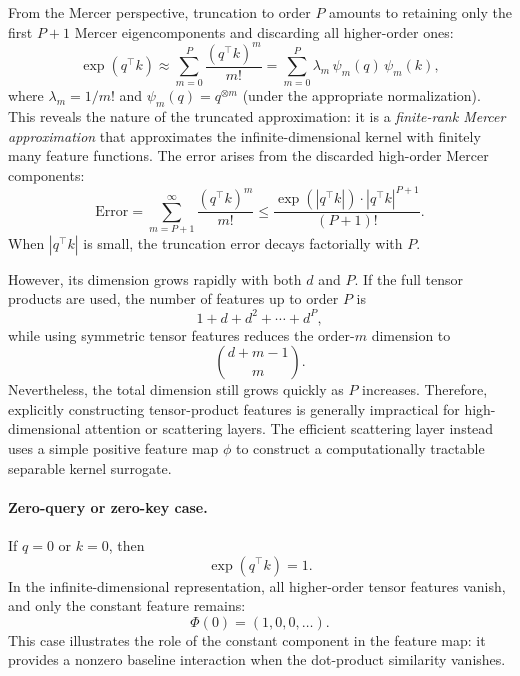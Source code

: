 \documentclass{article}
\begin{document}
From the Mercer perspective, truncation to order $P$ amounts to retaining only the first $P+1$ Mercer eigencomponents and discarding all higher-order ones:
\begin{equation}
    \exp(q^\top k)\approx\sum_{m=0}^{P}\frac{(q^\top k)^m}{m!}
    =
    \sum_{m=0}^{P}\lambda_m\,\psi_m(q)\,\psi_m(k),
\end{equation}
where $\lambda_m=1/m!$ and $\psi_m(q)=q^{\otimes m}$ (under the appropriate normalization). This reveals the nature of the truncated approximation: it is a \emph{finite-rank Mercer approximation} that approximates the infinite-dimensional kernel with finitely many feature functions. The error arises from the discarded high-order Mercer components:
\begin{equation}
    \text{Error}
    =
    \sum_{m=P+1}^{\infty}\frac{(q^\top k)^m}{m!}
    \leq
    \frac{\exp(|q^\top k|)\cdot|q^\top k|^{P+1}}{(P+1)!}.
\end{equation}
When $|q^\top k|$ is small, the truncation error decays factorially with $P$.

However, its dimension grows rapidly with both $d$ and $P$. 
If the full tensor products are used, the number of features up to order $P$ is
\begin{equation}
    1+d+d^2+\cdots+d^P,
\end{equation}
while using symmetric tensor features reduces the order-$m$ dimension to
\begin{equation}
    \binom{d+m-1}{m}.
\end{equation}
Nevertheless, the total dimension still grows quickly as $P$ increases. 
Therefore, explicitly constructing tensor-product features is generally impractical for high-dimensional attention or scattering layers. 
The efficient scattering layer instead uses a simple positive feature map $\phi$ to construct a computationally tractable separable kernel surrogate.

\paragraph{Zero-query or zero-key case.}
If $q=0$ or $k=0$, then
\begin{equation}
    \exp(q^\top k)=1.
\end{equation}
In the infinite-dimensional representation, all higher-order tensor features vanish, and only the constant feature remains:
\begin{equation}
    \Phi(0)=(1,0,0,\ldots).
\end{equation}
This case illustrates the role of the constant component in the feature map: it provides a nonzero baseline interaction when the dot-product similarity vanishes.
\end{document}
